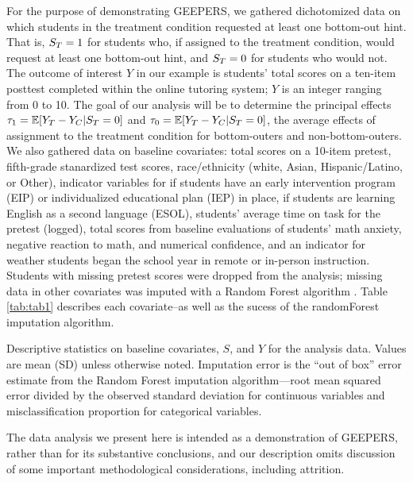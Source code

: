 \documentclass[11pt]{article} %
\begin{document}
For the purpose of demonstrating GEEPERS, we gathered dichotomized data on which students in the treatment condition requested at least one bottom-out hint.
That is, $S_T=1$ for students who, if assigned to the treatment condition, would request at least one bottom-out hint, and $S_T=0$ for students who would not.
The outcome of interest $Y$ in our example is students' total scores on a ten-item posttest completed within the online tutoring system; $Y$ is an integer ranging from 0 to 10.
The goal of our analysis will be to determine the principal effects $\tau_1=\mathbb{E}[Y_T-Y_C|S_T=0]$ and $\tau_0=\mathbb{E}[Y_T-Y_C|S_T=0]$, the average effects of assignment to the treatment condition for bottom-outers and non-bottom-outers.
We also gathered data on baseline covariates: total scores on a 10-item pretest, fifth-grade stanardized test scores, race/ethnicity (white, Asian, Hispanic/Latino, or Other), indicator variables for if students have an early intervention program (EIP) or individualized educational plan (IEP) in place, if students are learning English as a second language (ESOL), students' average time on task for the pretest (logged), total scores from baseline evaluations of students' math anxiety, negative reaction to math, and numerical confidence, and an indicator for weather students began the school year in remote or in-person instruction.
Students with missing pretest scores were dropped from the analysis; missing data in other covariates was imputed with a Random Forest algorithm \citep{missForest}.
Table \ref{tab:tab1} describes each covariate--as well as the sucess of the randomForest imputation algorithm.

\begin{table}
  \centering
  
  \caption{Descriptive statistics on baseline covariates, $S$, and $Y$ for the analysis data. Values are mean (SD) unless otherwise noted. Imputation error is the ``out of box'' error estimate from the Random Forest imputation algorithm---root mean squared error divided by the observed standard deviation for continuous variables and misclassification proportion for categorical variables.}
  \label{tab:tab1}
\end{table}


The data analysis we present here is intended as a demonstration of GEEPERS, rather than for its substantive conclusions, and our description omits discussion of some important methodological considerations, including attrition.
\end{document}
